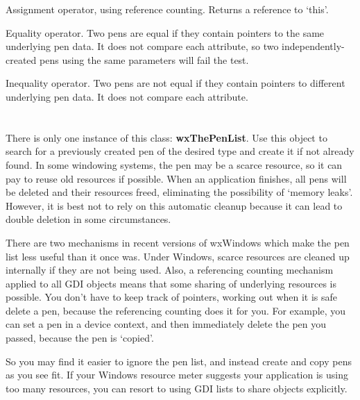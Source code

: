 
Assignment operator, using reference counting. Returns a reference
to `this'.

\label{wxpenequals}


Equality operator. Two pens are equal if they contain pointers
to the same underlying pen data. It does not compare each attribute,
so two independently-created pens using the same parameters will
fail the test.

\label{wxpennotequals}


Inequality operator. Two pens are not equal if they contain pointers
to different underlying pen data. It does not compare each attribute.

\section{}\label{wxpenlist}

There is only one instance of this class: {\bf wxThePenList}.  Use
this object to search for a previously created pen of the desired
type and create it if not already found. In some windowing systems,
the pen may be a scarce resource, so it can pay to reuse old
resources if possible. When an application finishes, all pens will
be deleted and their resources freed, eliminating the possibility of
`memory leaks'. However, it is best not to rely on this automatic
cleanup because it can lead to double deletion in some circumstances.

There are two mechanisms in recent versions of wxWindows which make the
pen list less useful than it once was. Under Windows, scarce resources
are cleaned up internally if they are not being used. Also, a referencing
counting mechanism applied to all GDI objects means that some sharing
of underlying resources is possible. You don't have to keep track of pointers,
working out when it is safe delete a pen, because the referencing counting does
it for you. For example, you can set a pen in a device context, and then
immediately delete the pen you passed, because the pen is `copied'.

So you may find it easier to ignore the pen list, and instead create
and copy pens as you see fit. If your Windows resource meter suggests
your application is using too many resources, you can resort to using
GDI lists to share objects explicitly.

